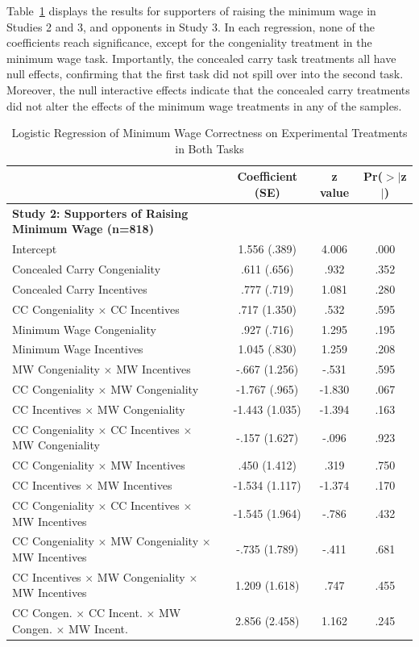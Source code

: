 \documentclass[12pt, letterpaper]{article}
\begin{document}
Table~\ref{tab:spillover} displays the results for supporters of raising the minimum wage in Studies 2 and 3, and opponents in Study 3. In each regression, none of the coefficients reach significance, except for the congeniality treatment in the minimum wage task. Importantly, the concealed carry task treatments all have null effects, confirming that the first task did not spill over into the second task. Moreover, the null interactive effects indicate that the concealed carry treatments did not alter the effects of the minimum wage treatments in any of the samples.

\medskip
\begin{table}[ht]
\centering
\caption{Logistic Regression of Minimum Wage Correctness on Experimental Treatments in Both Tasks} \label{tab:spillover}
\begin{tabular}{l c c c}
  \hline
 & Coefficient (SE) & z value & Pr($>$$|$z$|$) \\ 
  \hline
{\bf Study 2: Supporters of Raising Minimum Wage (n=818)}  & & & \\ 
  Intercept 									& 1.556 (.389) 	& 4.006 	& .000 \\ 
  Concealed Carry Congeniality					& .611 (.656) 	& .932 	& .352 \\ 
  Concealed Carry Incentives					& .777 (.719) 	& 1.081 	& .280 \\ 
  CC Congeniality $\times$ CC Incentives			& .717 (1.350) 	& .532 	& .595 \\ 
  Minimum Wage Congeniality					& .927 (.716) 	& 1.295 	& .195 \\ 
  Minimum Wage Incentives						& 1.045 (.830) 	& 1.259 	& .208 \\ 
  MW Congeniality $\times$ MW Incentives			& -.667 (1.256) 	& -.531 	& .595 \\ 

  CC Congeniality $\times$ MW Congeniality	  		& -1.767 (.965)	& -1.830 	& .067 \\ 
  CC Incentives $\times$ MW Congeniality			& -1.443 (1.035)	& -1.394 	& .163 \\ 
  CC Congeniality $\times$ CC Incentives $\times$ MW Congeniality 
										& -.157 (1.627)	& -.096	& .923 \\ 
  CC Congeniality $\times$ MW Incentives			& .450 (1.412) 	& .319 	& .750 \\ 
  CC Incentives $\times$ MW Incentives			& -1.534 (1.117) & -1.374 	& .170 \\ 
  CC Congeniality $\times$ CC Incentives $\times$ MW Incentives 
										& -1.545 (1.964)	& -.786	& .432 \\ 
  CC Congeniality $\times$ MW Congeniality $\times$ MW Incentives 
										& -.735 (1.789)	& -.411	& .681 \\ 
  CC Incentives $\times$ MW Congeniality $\times$ MW Incentives 
										& 1.209 (1.618)	& .747 	& .455 \\ 
  CC Congen. $\times$ CC Incent. $\times$ MW Congen. $\times$ MW Incent. 
										& 2.856 (2.458)	& 1.162	& .245 \\ \hline


\end{tabular}
\end{table}
\end{document}
